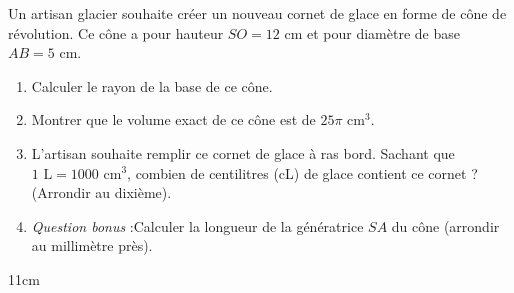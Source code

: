 \documentclass[a4paper]{book}
\begin{document}
    \begin{exercice}
    Un artisan glacier souhaite créer un nouveau cornet de glace en forme de cône de révolution. 
    Ce cône a pour hauteur $SO = 12 \text{ cm}$ et pour diamètre de base $AB = 5 \text{ cm}$.
    
    \begin{enumerate}
        \item Calculer le rayon de la base de ce cône.
        \item Montrer que le volume exact de ce cône est de $25\pi \text{ cm}^3$.
        \item L'artisan souhaite remplir ce cornet de glace à ras bord. Sachant que $1 \text{ L} = 1000 \text{ cm}^3$, combien de centilitres (cL) de glace contient ce cornet ? (Arrondir au dixième).
        \item \textit{Question bonus} :Calculer la longueur de la génératrice $SA$ du cône (arrondir au millimètre près).
    \end{enumerate}
    \end{exercice}
    
    \begin{ZoneReponse}{11cm}
    \end{ZoneReponse}
\end{document}
